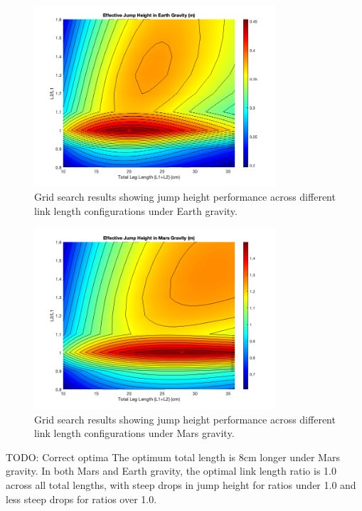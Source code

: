\begin{figure}[h]
    \centering
    \includegraphics[width=0.8\textwidth]{Images/results/grid_search_earth.png}
    \caption{Grid search results showing jump height performance across different link length configurations under Earth gravity.}
    \label{fig:results:grid_search_earth}
\end{figure}



\begin{figure}[h]
    \centering
    \includegraphics[width=0.8\textwidth]{Images/results/grid_search_mars.png}
    \caption{Grid search results showing jump height performance across different link length configurations under Mars gravity.}
    \label{fig:results:grid_search_mars}
\end{figure}

TODO: Correct optima
The optimum total length is 8cm longer under Mars gravity. In both Mars and Earth gravity, the optimal link length ratio is 1.0 across all total lengths, with steep drops in jump height for ratios under 1.0 and less steep drops for ratios over 1.0. 

